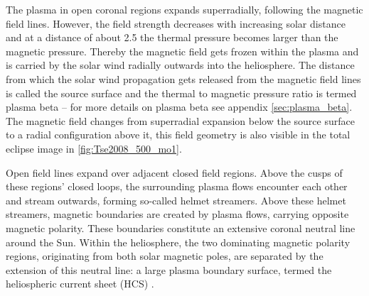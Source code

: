The plasma in open coronal regions expands superradially, following the magnetic field lines. However, the field strength decreases with increasing solar distance and at a distance of about \SI{2.5}{\Rs} the thermal pressure becomes larger than the magnetic pressure. Thereby the magnetic field gets frozen within the plasma and is carried by the solar wind radially outwards into the heliosphere. The distance from which the solar wind propagation gets released from the magnetic field lines is called the source surface \citep{Schatten1969} and the thermal to magnetic pressure ratio is termed plasma beta -- for more details on plasma beta see appendix \autoref{sec:plasma_beta}. The magnetic field changes from superradial expansion below the source surface to a radial configuration above it, this field geometry is also visible in the total eclipse image in \autoref{fig:Tse2008_500_mo1}.

Open field lines expand over adjacent closed field regions. Above the cusps of these regions' closed loops, the surrounding plasma flows encounter each other and stream outwards, forming so-called helmet streamers. Above these helmet streamers, magnetic boundaries are created by plasma flows, carrying opposite magnetic polarity. These boundaries constitute an extensive coronal neutral line around the Sun. Within the heliosphere, the two dominating magnetic polarity regions, originating from both solar magnetic poles, are separated by the extension of this neutral line: a large plasma boundary surface, termed the heliospheric current sheet (HCS) \citep{Smith2001}.


